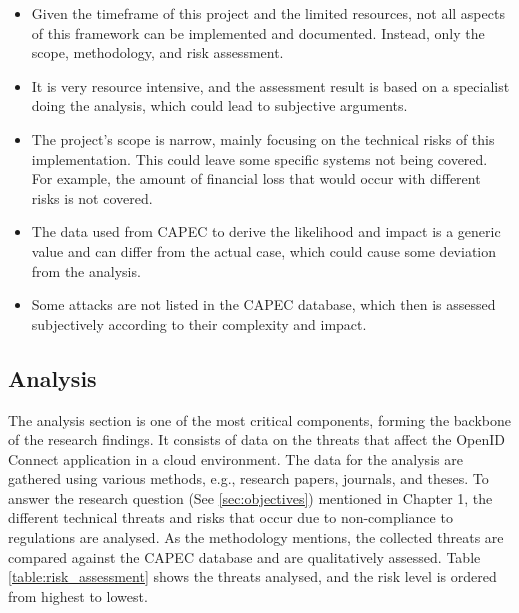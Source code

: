 \begin{itemize}
    \item Given the timeframe of this project and the limited resources, not all aspects of this framework can be implemented and documented. Instead, only the scope, methodology, and risk assessment.
    \item It is very resource intensive, and the assessment result is based on a specialist doing the analysis, which could lead to subjective arguments.
    \item The project's scope is narrow, mainly focusing on the technical risks of this implementation. This could leave some specific systems not being covered. For example, the amount of financial loss that would occur with different risks is not covered.
    \item The data used from CAPEC to derive the likelihood and impact is a generic value and can differ from the actual case, which could cause some deviation from the analysis.
    \item Some attacks are not listed in the CAPEC database, which then is assessed subjectively according to their complexity and impact. 
\end{itemize}

\subsection{Analysis}
 The analysis section is one of the most critical components, forming the backbone of the research findings. It consists of data on the threats that affect the OpenID Connect application in a cloud environment. The data for the analysis are gathered using various methods, e.g., research papers, journals, and theses. To answer the research question (See \ref{sec:objectives}) mentioned in Chapter 1, the different technical threats and risks that occur due to non-compliance to regulations are analysed. As the methodology mentions, the collected threats are compared against the CAPEC database and are qualitatively assessed. Table \ref{table:risk_assessment} shows the threats analysed, and the risk level is ordered from highest to lowest. 



